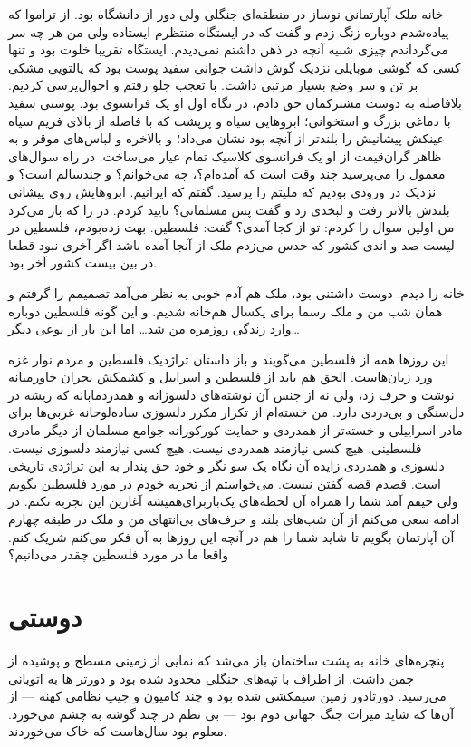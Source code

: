 \documentclass[letterpaper,12pt,oneside]{article}  %
\begin{document}
خانه ملک آپارتمانی نوساز در منطقه‌ای جنگلی ولی دور از دانشگاه بود. از تراموا که پیاده‌شدم دوباره زنگ زدم و گفت که در ایستگاه منتظرم ایستاده ولی من هر چه سر می‌گرداندم چیزی شبیه آنچه در ذهن داشتم نمی‌دیدم. ایستگاه تقریبا خلوت بود و تنها کسی که گوشی موبایلی نزدیک گوش داشت جوانی سفید پوست بود که پالتویی مشکی بر تن و سر وضع بسیار مرتبی داشت. با تعجب جلو رفتم و احوال‌پرسی کردیم. بلافاصله به دوست مشترکمان حق دادم، در نگاه اول او یک فرانسوی بود. پوستی سفید با دماغی بزرگ و استخوانی؛ ابرو‌هایی سیاه و پرپشت که با فاصله از بالای فریم سیاه عینکش پیشانیش را بلندتر از آنچه بود نشان می‌داد؛ و بالاخره و لباس‌های موقر و به ظاهر گران‌قیمت از او یک فرانسوی کلاسیک تمام عیار‌ می‌ساخت. در راه سوال‌های معمول را می‌پرسید چند وقت است که آمده‌ام؟، چه می‌خوانم؟ و چند‌سالم است؟ و نزدیک در ورودی بودیم که ملیتم را پرسید. گفتم که ایرانیم. ابرو‌هایش روی پیشانی‌ بلندش بالاتر رفت و لبخدی زد و گفت پس مسلمانی؟ تایید کردم. در را که باز می‌کرد من اولین سوال را کردم: تو از کجا آمدی؟ گفت: فلسطین. بهت زده‌بودم، فلسطین در لیست صد و اندی کشور که حدس می‌زدم ملک از آنجا آمده باشد اگر آخری نبود قطعا در بین بیست کشور آخر بود.

خانه را دیدم. دوست داشتنی بود، ملک هم آدم خوبی به نظر می‌آمد تصمیمم را گرفتم و همان شب من و ملک رسما برای یکسال هم‌خانه شدیم. و این گونه فلسطین دوباره وارد زندگی روزمره من شد… اما این بار از نوعی دیگر…

این روزها همه از فلسطین می‌گویند و باز داستان تراژدیک فلسطین و مردم نوار غزه ورد زبان‌هاست. الحق هم باید از فلسطین و اسراییل و کشمکش بحران خاورمیانه نوشت و حرف زد، ولی نه از جنس آن نوشته‌های دلسوزانه و همدردمابانه که ریشه در دل‌سنگی و بی‌دردی دارد. من خسته‌ام از تکرار مکرر دلسوزی ساده‌لوحانه غربی‌ها برای مادر اسراییلی و خسته‌تر از همدردی و حمایت کورکورانه جوامع مسلمان از دیگر مادری فلسطینی. هیچ کسی نیازمند همدردی نیست. هیچ کسی نیازمند دلسوزی نیست. دلسوزی و همدردی زایده آن نگاه یک سو نگر و خود حق پندار به این تراژدی تاریخی است.
قصدم قصه گفتن نیست. می‌خواستم از تجربه خودم در مورد فلسطین بگویم ولی حیفم آمد شما را همراه آن لحظه‌های یک‌باربرای‌همیشه آغازین این تجربه نکنم. در ادامه سعی می‌کنم از آن شب‌های بلند و حرف‌های بی‌انتهای من و ملک در طبقه چهارم آن آپارتمان بگویم تا شاید شما را هم در آنچه این روزها به آن فکر می‌کنم شریک کنم. واقعا ما در مورد فلسطین چقدر می‌دانیم؟

\section{دوستی}
پنچره‌های خانه به پشت ساختمان باز می‌شد که نمایی از زمینی مسطح و پوشیده از چمن داشت. از اطراف با تپه‌های جنگلی محدود شده بود و دورتر ها به اتوبانی می‌رسید. دورتادور زمین سیمکشی شده بود و چند کامیون و جیپ نظامی‌ کهنه — از آن‌ها که شاید میراث جنگ جهانی دوم بود — بی نظم در چند گوشه به چشم می‌خورد. معلوم بود سال‌هاست که خاک می‌خوردند.
\end{document}
